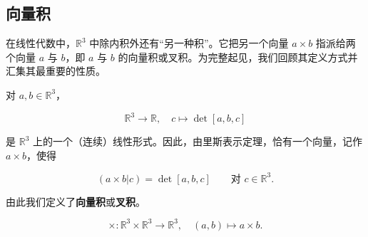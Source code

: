 \subsection*{向量积}

在线性代数中，$ \mathbb{R}^{3} $ 中除内积外还有“另一种积”。它把另一个向量 $ a \times b $ 指派给两个向量 $ a $ 与 $ b $，即 $ a $ 与 $ b $ 的向量积或叉积。为完整起见，我们回顾其定义方式并汇集其最重要的性质。

对 $ a, b \in \mathbb{R}^{3} $，

\[
\mathbb{R}^{3} \to \mathbb{R} , \quad c \mapsto \det[a, b, c]
\]

是 $ \mathbb{R}^{3} $ 上的一个（连续）线性形式。因此，由里斯表示定理，恰有一个向量，记作 $ a \times b $，使得

\begin{equation}
(a \times b|c) = \det[a, b, c] \qquad \text{对 } c \in \mathbb{R}^{3} .\tag{2.9}
\end{equation}

由此我们定义了\textbf{向量积}或\textbf{叉积}。

\[
\times : \mathbb{R}^{3} \times \mathbb{R}^{3} \to \mathbb{R}^{3} , \quad (a, b) \mapsto a \times b .
\]

